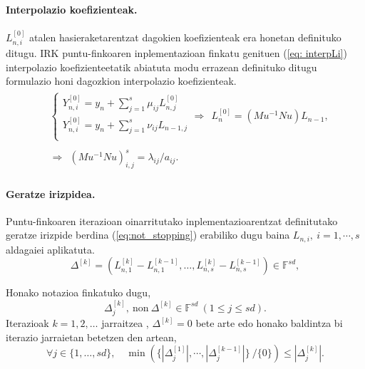 \paragraph*{Interpolazio koefizienteak.} $L_{n,i}^{[0]}$ atalen hasieraketarentzat dagokien koefizienteak era honetan definituko ditugu. IRK puntu-finkoaren inplementazioan finkatu genituen (\ref{eq: interpLi}) interpolazio koefizienteetatik abiatuta  modu errazean definituko ditugu formulazio honi dagozkion interpolazio koefizienteak.
\begin{align}
\begin{split}
&\left \{ \begin{array}{c}
  Y_{n,i}^{[0]}=y_n+\sum_{j=1}^{s} \mu_{ij} L_{n,j}^{[0]} \\[.25cm]
  Y_{n,i}^{[0]}=y_n+\sum_{j=1}^{s} \nu_{ij} L_{n-1,j} \\
          \end{array} \right. 
\Rightarrow \ \ L_n^{{[0]}}=(Mu^{-1} Nu) L_{n-1},\\
\\
&\Rightarrow  \ \ (Mu^{-1} Nu)_{i,j}^{s}=\lambda_{ij}/a_{ij}.
\end{split}
\end{align}

\paragraph*{Geratze irizpidea.} Puntu-finkoaren iterazioan oinarritutako inplementazioarentzat definitutako geratze irizpide berdina (\ref{eq:not_stopping}) erabiliko dugu baina $L_{n,i}, \ i=1,\cdots,s$ aldagaiei aplikatuta.
\begin{equation*}
\Delta^{[k]}=(L_{n,1}^{[k]}-L_{n,1}^{[k-1]},\dots,L_{n,s}^{[k]}-L_{n,s}^{[k-1]}) \in \mathbb{F}^{sd},
\end{equation*}

Honako notazioa finkatuko dugu,
\begin{equation*}
\Delta_j^{[k]}, \ \text{non} \ \Delta^{[k]} \in \mathbb{F}^{sd}  \ (1\leqslant j \leqslant sd).
\end{equation*}
 Iterazioak  $k=1,2,\ldots$ jarraitzea , $ \Delta^{[k]} =0$ bete arte edo honako baldintza bi iterazio jarraietan betetzen den artean,
\begin{equation}
\label{eq:not_stoppingLi}
\forall j \in \{1,\ldots,s d\},  \quad
\min \left(\{|\Delta_j^{[1]}|,\cdots ,|\Delta_j^{[k-1]}|\} \ /\{0\} \right) \leqslant |\Delta_j^{[k]}|.
\end{equation}


